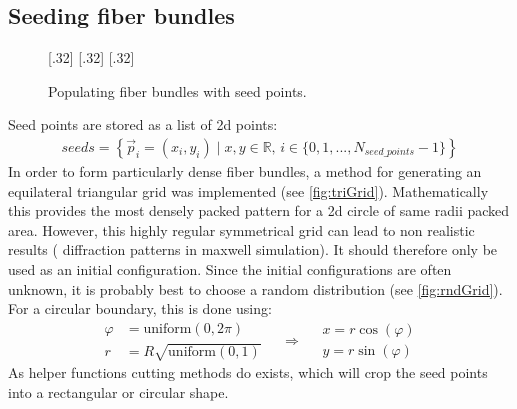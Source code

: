 \subsection{Seeding fiber bundles}\label{sec:seeds}
%
\begin{figure}[!t]
    \def\tikzheight{0.25\textwidth}
    \centering
    [.32\textwidth]{
    }
    \hfill
    [.32\textwidth]{
    }
    \hfill
    [.32\textwidth]{
    }
	\caption{Populating fiber bundles with seed points.}
\end{figure}
%
Seed points are stored as a list of 2d points:
\begin{align}
\mathit{seeds} = \left\{ \vec{p}_i=(x_i,y_i) \mid x,y \in \mathbb{R} , \, i \in \{0,1,...,N_{\mathit{seed\_points}}-1\}\right\}
\end{align}
%
In order to form particularly dense fiber bundles, a method for generating an equilateral triangular grid was implemented (see \ref{fig:triGrid}).
Mathematically this provides the most densely packed pattern for a 2d circle of same radii packed area.
However, this highly regular symmetrical grid can lead to non realistic results (\eg{} diffraction patterns in maxwell simulation).
It should therefore only be used as an initial configuration.
Since the initial configurations are often unknown, it is probably best to choose a random distribution (see \cref{fig:rndGrid}).
For a circular boundary, this is done using:
\begin{equation}
\begin{split}
\varphi &= \mathrm{uniform}(0,2 \pi) \\
r &= R \sqrt{\mathrm{uniform}(0,1)}
\end{split}
\quad\Rightarrow\quad
\begin{split}
x = r \cos(\varphi)\\
y = r \sin(\varphi)
\end{split}
\end{equation}
%
As helper functions cutting methods do exists, which will crop the seed points into a rectangular or circular shape.
%
%
%

